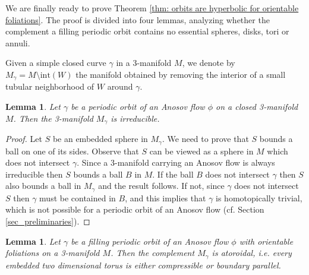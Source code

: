 \documentclass[12pt]{amsart}
\newtheorem{lemma}[theorem]{Lemma}
\theoremstyle{definition}
\theoremstyle{remark}
\newcommand{\mg}{M_\gamma}
\begin{document}
We are finally ready to prove Theorem \ref{thm: orbits are hyperbolic for orientable foliations}. The proof is divided into four lemmas, analyzing whether the complement a filling periodic orbit contains no essential spheres, disks, tori or annuli. 

Given a simple closed curve $\gamma$ in a 3-manifold $M$, we denote by $\mg=M\setminus\mathrm{int}(W)$ the manifold obtained by removing the interior of a small tubular neighborhood of $W$ around $\gamma$. 

\begin{lemma}\label{lem:irreducible}
    Let $\gamma$ be a periodic orbit of an Anosov flow $\phi$ on a closed 3-manifold $M$. Then the 3-manifold $\mg$ is irreducible.
\end{lemma}


\begin{proof}
Let $S$ be an embedded sphere in $\mg$. We need to prove that $S$ bounds a ball on one of its sides. Observe that $S$ can be viewed as a sphere in $M$ which does not intersect $\gamma$. Since a 3-manifold carrying an Anosov flow is always irreducible then $S$ bounds a ball $B$ in $M$. If the ball $B$ does not intersect $\gamma$ then $S$ also bounds a ball in $\mg$ and the result follows. If not, since $\gamma$ does not intersect $S$ then $\gamma$ must be contained in $B$, and this implies that $\gamma$ is homotopically trivial, which is not possible for a periodic orbit of an Anosov flow (cf. Section \ref{sec_preliminaries}).
\end{proof}


\begin{lemma}\label{lem:atoroidal}
    Let $\gamma$ be a filling periodic orbit of an Anosov flow $\phi$ with orientable foliations on a 3-manifold $M$. Then the complement $\mg$ is atoroidal, i.e. every embedded two dimensional torus is either compressible or boundary parallel.
\end{lemma}
\end{document}
